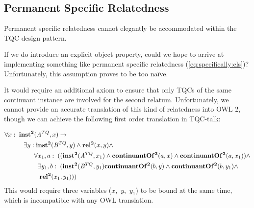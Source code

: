 \subsection*{Permanent Specific Relatedness}
Permanent specific relatedness cannot elegantly be accommodated within the TQC design pattern. 

If we do introduce an explicit object property, could we hope to arrive at
implementing something like permanent specific relatedness
(\ref{eq:specifically:cls})? Unfortunately, this assumption proves to be too na\"ive.

It would require an additional axiom to ensure that only TQCs of the same continuant instance are involved
for the second relatum. Unfortunately, we cannot provide an
accurate translation of this kind of relatedness into OWL 2, though we can
achieve the following first order translation in TQC-talk:

 \begin{equation}
\begin{split}
\forall x:\; \mathrm{\mathbf{inst^2}}&(\mathit{A}^{TQ},x) \rightarrow \\
 \exists y:&\;\mathrm{\mathbf{inst^2}}(\mathit{B}^{TQ},y) \wedge \mathrm{\mathbf{rel^2}}(x,y)\wedge\\
 & \forall x_1,a:\; ((\mathrm{\mathbf{inst^2}}(\mathit{A}^{TQ},x_1) \wedge
\mathrm{\mathbf{continuantOf^2}}(a,x) \wedge \mathrm{\mathbf{continuantOf^2}}(a,x_1))\wedge\\
&\;\;\exists y_1,b:\;(\mathrm{\mathbf{inst^2}}(\mathit{B}^{TQ},y_1) \mathrm{\mathbf{continuantOf^2}}(b,y)  
\wedge \mathrm{\mathbf{continuantOf^2}}(b,y_1) \wedge\\&\;\;\;\mathrm{\mathbf{rel^2}}(x_1,y_1)))
\end{split}
\end{equation}
This would require three variables ($x$,~$y$,~$y_1$) to be bound at the same
time, which is incompatible with any OWL translation.

